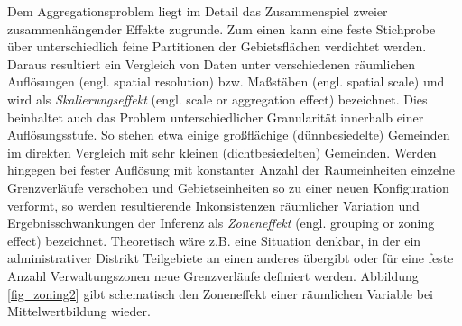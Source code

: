 Dem Aggregationsproblem liegt im Detail das Zusammenspiel zweier zusammenhängender Effekte zugrunde. 
Zum einen kann eine feste Stichprobe über unterschiedlich feine Partitionen der Gebietsflächen verdichtet werden. 
Daraus resultiert ein Vergleich von Daten unter verschiedenen räumlichen Auflösungen (engl. spatial resolution) bzw. Maßstäben (engl. spatial scale)
und wird als \emph{Skalierungseffekt} (engl. scale or aggregation effect) bezeichnet.
Dies beinhaltet auch das Problem unterschiedlicher Granularität innerhalb einer Auflösungsstufe. 
So stehen etwa einige großflächige (dünnbesiedelte) Gemeinden im direkten Vergleich mit sehr kleinen (dichtbesiedelten) Gemeinden.
Werden hingegen bei fester Auflösung mit konstanter Anzahl der Raumeinheiten einzelne Grenzverläufe verschoben und Gebietseinheiten so zu einer neuen Konfiguration verformt, 
so werden resultierende Inkonsistenzen räumlicher Variation und Ergebnisschwankungen der Inferenz als \emph{Zoneneffekt} (engl. grouping or zoning effect) bezeichnet. 
Theoretisch wäre z.B. eine Situation denkbar, in der ein administrativer Distrikt Teilgebiete an einen anderes übergibt 
oder für eine feste Anzahl Verwaltungszonen neue Grenzverläufe definiert werden.
Abbildung \ref{fig_zoning2} gibt schematisch den Zoneneffekt einer räumlichen Variable bei Mittelwertbildung wieder.

